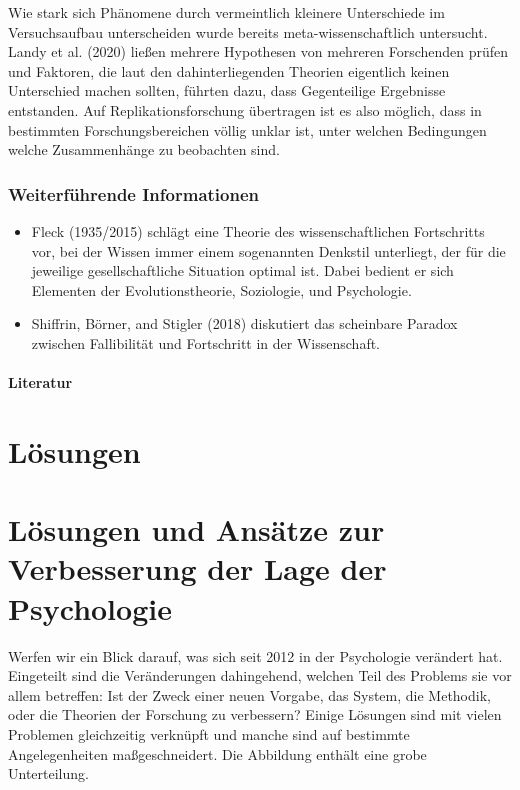 \documentclass[
  letterpaper,
  DIV=11,
  numbers=noendperiod]{scrreprt}
\begin{document}
Wie stark sich Phänomene durch vermeintlich kleinere Unterschiede im
Versuchsaufbau unterscheiden wurde bereits meta-wissenschaftlich
untersucht. Landy et al. (2020) ließen mehrere Hypothesen von mehreren
Forschenden prüfen und Faktoren, die laut den dahinterliegenden Theorien
eigentlich keinen Unterschied machen sollten, führten dazu, dass
Gegenteilige Ergebnisse entstanden. Auf Replikationsforschung übertragen
ist es also möglich, dass in bestimmten Forschungsbereichen völlig
unklar ist, unter welchen Bedingungen welche Zusammenhänge zu beobachten
sind.

\section{Weiterführende
Informationen}\label{weiterfuxfchrende-informationen-2}

\begin{itemize}
\item
  Fleck (1935/2015) schlägt eine Theorie des wissenschaftlichen
  Fortschritts vor, bei der Wissen immer einem sogenannten Denkstil
  unterliegt, der für die jeweilige gesellschaftliche Situation optimal
  ist. Dabei bedient er sich Elementen der Evolutionstheorie,
  Soziologie, und Psychologie.
\item
  Shiffrin, Börner, and Stigler (2018) diskutiert das scheinbare Paradox
  zwischen Fallibilität und Fortschritt in der Wissenschaft.
\end{itemize}

\subsection{Literatur}\label{literatur-12}

\part{Lösungen}

\part{Lösungen und Ansätze zur Verbesserung der Lage der Psychologie}

Werfen wir ein Blick darauf, was sich seit 2012 in der Psychologie
verändert hat. Eingeteilt sind die Veränderungen dahingehend, welchen
Teil des Problems sie vor allem betreffen: Ist der Zweck einer neuen
Vorgabe, das System, die Methodik, oder die Theorien der Forschung zu
verbessern? Einige Lösungen sind mit vielen Problemen gleichzeitig
verknüpft und manche sind auf bestimmte Angelegenheiten maßgeschneidert.
Die Abbildung enthält eine grobe Unterteilung.
\end{document}
